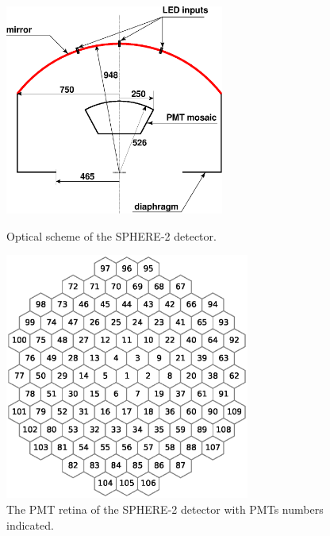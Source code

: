 \documentclass[final,5p,times,twocolumn]{elsarticle}
\begin{document}
\begin{figure}[tb]
\begin{minipage}[t]{0.47\textwidth}
\centering
\includegraphics[width=17pc]{figs/optics_side}\hspace{2pc}%
\caption{Optical scheme of the \mbox{SPHERE-2} detector.}
\label{fig:optics}
\end{minipage}
\hfill
\begin{minipage}[t]{0.47\textwidth}
\centering
\includegraphics[width=19pc]{figs/retina.eps}%
\vspace{-1.0pc}
\caption{The PMT retina of the SPHERE-2 detector with PMTs numbers indicated.}
\label{fig:retina}
\end{minipage}
\end{figure}
\end{document}
